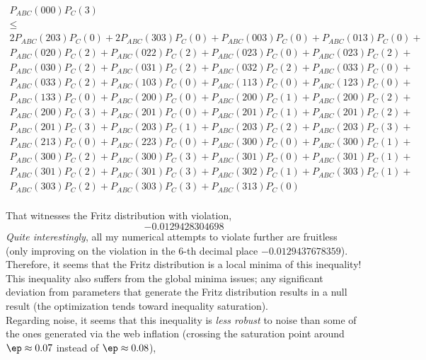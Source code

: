 \documentclass[12pt]{article}
\begin{document}
    \begin{gather*}
    P_{ABC}(000)P_{C}(3) \\
    \leq \\
    2P_{ABC}(203)P_{C}(0) + 2P_{ABC}(303)P_{C}(0) + P_{ABC}(003)P_{C}(0) + P_{ABC}(013)P_{C}(0) + \\
    P_{ABC}(020)P_{C}(2) + P_{ABC}(022)P_{C}(2) + P_{ABC}(023)P_{C}(0) + P_{ABC}(023)P_{C}(2) + \\
    P_{ABC}(030)P_{C}(2) + P_{ABC}(031)P_{C}(2) + P_{ABC}(032)P_{C}(2) + P_{ABC}(033)P_{C}(0) + \\
    P_{ABC}(033)P_{C}(2) + P_{ABC}(103)P_{C}(0) + P_{ABC}(113)P_{C}(0) + P_{ABC}(123)P_{C}(0) + \\
    P_{ABC}(133)P_{C}(0) + P_{ABC}(200)P_{C}(0) + P_{ABC}(200)P_{C}(1) + P_{ABC}(200)P_{C}(2) + \\
    P_{ABC}(200)P_{C}(3) + P_{ABC}(201)P_{C}(0) + P_{ABC}(201)P_{C}(1) + P_{ABC}(201)P_{C}(2) + \\
    P_{ABC}(201)P_{C}(3) + P_{ABC}(203)P_{C}(1) + P_{ABC}(203)P_{C}(2) + P_{ABC}(203)P_{C}(3) + \\
    P_{ABC}(213)P_{C}(0) + P_{ABC}(223)P_{C}(0) + P_{ABC}(300)P_{C}(0) + P_{ABC}(300)P_{C}(1) + \\
    P_{ABC}(300)P_{C}(2) + P_{ABC}(300)P_{C}(3) + P_{ABC}(301)P_{C}(0) + P_{ABC}(301)P_{C}(1) + \\
    P_{ABC}(301)P_{C}(2) + P_{ABC}(301)P_{C}(3) + P_{ABC}(302)P_{C}(1) + P_{ABC}(303)P_{C}(1) + \\
    P_{ABC}(303)P_{C}(2) + P_{ABC}(303)P_{C}(3) + P_{ABC}(313)P_{C}(0) \\
    \end{gather*}

    That witnesses the Fritz distribution with violation,
    \[ -0.0129428304698 \]
    \textit{Quite interestingly}, all my numerical attempts to violate further are fruitless (only improving on the violation in the $6$-th decimal place $-0.0129437678359$). Therefore, it seems that the Fritz distribution is a local minima of this inequality! This inequality also suffers from the global minima issues; any significant deviation from parameters that generate the Fritz distribution results in a null result (the optimization tends toward inequality saturation).\\

    Regarding noise, it seems that this inequality is \textit{less robust} to noise than some of the ones generated via the web inflation (crossing the saturation point around $\ep \approx 0.07$ instead of $\ep \approx 0.08$),
\end{document}
